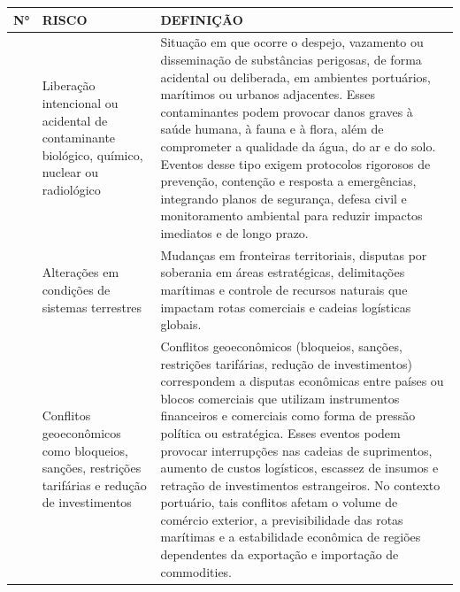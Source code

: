 \documentclass[
  portuguese,
  letterpaper,
  DIV=11,
  numbers=noendperiod]{scrreprt}
\begin{document}
\begin{longtable}[]{@{}
  >{\raggedright\arraybackslash}p{}
  >{\raggedright\arraybackslash}p{}
  >{\raggedright\arraybackslash}p{}@{}}
\toprule\noalign{}
\begin{minipage}[b]{\linewidth}\raggedright
N°
\end{minipage} & \begin{minipage}[b]{\linewidth}\raggedright
RISCO
\end{minipage} & \begin{minipage}[b]{\linewidth}\raggedright
DEFINIÇÃO
\end{minipage} \\
\midrule\noalign{}
\endhead
\bottomrule\noalign{}
\endlastfoot
1 & Liberação intencional ou acidental de contaminante biológico,
químico, nuclear ou radiológico & Situação em que ocorre o despejo,
vazamento ou disseminação de substâncias perigosas, de forma acidental
ou deliberada, em ambientes portuários, marítimos ou urbanos adjacentes.
Esses contaminantes podem provocar danos graves à saúde humana, à fauna
e à flora, além de comprometer a qualidade da água, do ar e do solo.
Eventos desse tipo exigem protocolos rigorosos de prevenção, contenção e
resposta a emergências, integrando planos de segurança, defesa civil e
monitoramento ambiental para reduzir impactos imediatos e de longo
prazo. \\
2 & Alterações em condições de sistemas terrestres & Mudanças em
fronteiras territoriais, disputas por soberania em áreas estratégicas,
delimitações marítimas e controle de recursos naturais que impactam
rotas comerciais e cadeias logísticas globais. \\
3 & Conflitos geoeconômicos como bloqueios, sanções, restrições
tarifárias e redução de investimentos & Conflitos geoeconômicos
(bloqueios, sanções, restrições tarifárias, redução de investimentos)
correspondem a disputas econômicas entre países ou blocos comerciais que
utilizam instrumentos financeiros e comerciais como forma de pressão
política ou estratégica. Esses eventos podem provocar interrupções nas
cadeias de suprimentos, aumento de custos logísticos, escassez de
insumos e retração de investimentos estrangeiros. No contexto portuário,
tais conflitos afetam o volume de comércio exterior, a previsibilidade
das rotas marítimas e a estabilidade econômica de regiões dependentes da
exportação e importação de commodities. \\

\end{longtable}
\end{document}
